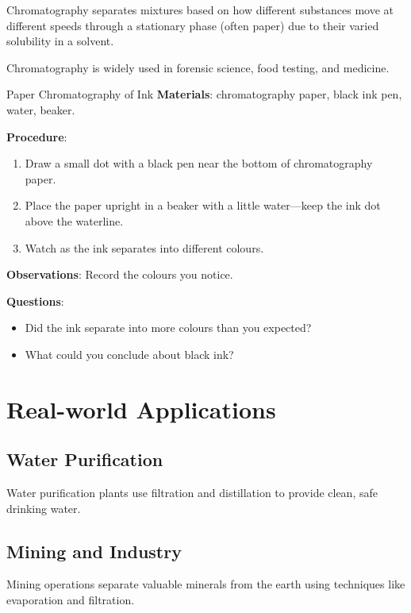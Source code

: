 \begin{keyconcept}{Chromatography}
 separates mixtures based on how different substances move at different speeds through a stationary phase (often paper) due to their varied solubility in a solvent.
\end{keyconcept}

Chromatography is widely used in forensic science, food testing, and medicine.

\begin{investigation}{Paper Chromatography of Ink}
\textbf{Materials}: chromatography paper, black ink pen, water, beaker.

\textbf{Procedure}:
\begin{enumerate}
\item Draw a small dot with a black pen near the bottom of chromatography paper.
\item Place the paper upright in a beaker with a little water—keep the ink dot above the waterline.
\item Watch as the ink separates into different colours.
\end{enumerate}

\textbf{Observations}: Record the colours you notice.

\textbf{Questions}:
\begin{itemize}
\item Did the ink separate into more colours than you expected?
\item What could you conclude about black ink?
\end{itemize}
\end{investigation}

\section{Real-world Applications}

\subsection{Water Purification}

Water purification plants use filtration and distillation to provide clean, safe drinking water.

\subsection{Mining and Industry}

Mining operations separate valuable minerals from the earth using techniques like evaporation and filtration.

